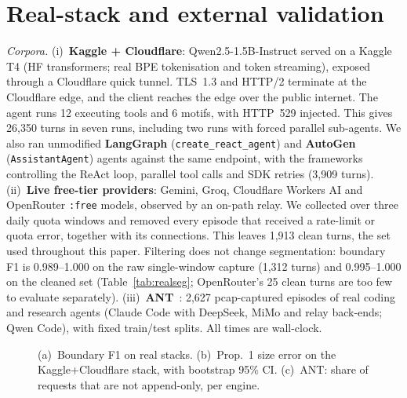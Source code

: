 \section{Real-stack and external validation}\label{sec:real}
\emph{Corpora.} (i)~\textbf{Kaggle + Cloudflare}: Qwen2.5-1.5B-Instruct served on a Kaggle T4 (HF transformers; real BPE tokenisation and token streaming), exposed through a Cloudflare quick tunnel. TLS~1.3 and HTTP/2 terminate at the Cloudflare edge, and the client reaches the edge over the public internet. The agent runs 12 executing tools and 6 motifs, with HTTP~529 injected. This gives 26,350 turns in seven runs, including two runs with forced parallel sub-agents. We also ran unmodified \textbf{LangGraph} (\texttt{create\_react\_agent}) and \textbf{AutoGen} (\texttt{AssistantAgent}) agents against the same endpoint, with the frameworks controlling the ReAct loop, parallel tool calls and SDK retries (3,909 turns). (ii)~\textbf{Live free-tier providers}: Gemini, Groq, Cloudflare Workers AI and OpenRouter \texttt{:free} models, observed by an on-path relay. We collected over three daily quota windows and removed every episode that received a rate-limit or quota error, together with its connections. This leaves 1,913 clean turns, the set used throughout this paper. Filtering does not change segmentation: boundary F1 is 0.989--1.000 on the raw single-window capture (1,312 turns) and 0.995--1.000 on the cleaned set (Table~\ref{tab:realseg}; OpenRouter's 25 clean turns are too few to evaluate separately). (iii)~\textbf{ANT}~\cite{ant}: 2,627 pcap-captured episodes of real coding and research agents (Claude Code with DeepSeek, MiMo and relay back-ends; Qwen Code), with fixed train/test splits. All times are wall-clock.

\begin{figure}[t]\centering{}
\caption{(a)~Boundary F1 on real stacks. (b)~Prop.~1 size error on the Kaggle+Cloudflare stack, with bootstrap 95\% CI. (c)~ANT: share of requests that are not append-only, per engine.}\label{fig:realant}\end{figure}


